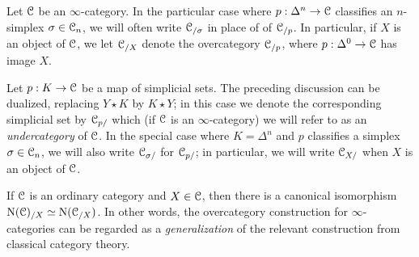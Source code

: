 \begin{1.2.9 Over- and under-categories}
\begin{remark}
Let $\operatorname{\mathcal{C}}$ be an $\infty$-category.
In the particular case where $p: \Delta^n \rightarrow \operatorname{\mathcal{C}}$ classifies an
$n$-simplex $\sigma \in \operatorname{\mathcal{C}}_n$, we will often write $\operatorname{\mathcal{C}}_{/\sigma}$ in place of of $\operatorname{\mathcal{C}}_{/p}$.
In particular, if $X$ is an object of $\operatorname{\mathcal{C}}$, we let $\operatorname{\mathcal{C}}_{/X}$ denote the overcategory
$\operatorname{\mathcal{C}}_{/p}$, where $p: \Delta^0 \rightarrow \operatorname{\mathcal{C}}$ has image $X$.
\end{remark}

\begin{remark} Let $p: K \rightarrow \operatorname{\mathcal{C}}$ be a map of simplicial sets. The
preceding discussion can be dualized, replacing $Y \star K$
by $K \star Y$; in this case we denote the corresponding simplicial set
by $\operatorname{\mathcal{C}}_{p/}$ which (if $\operatorname{\mathcal{C}}$ is an $\infty$-category) we will refer to as an
{\it undercategory} of $\operatorname{\mathcal{C}}$. In the special case where $K = \Delta^n$ and $p$ classifies a simplex $\sigma \in \operatorname{\mathcal{C}}_{n}$, we will also write $\operatorname{\mathcal{C}}_{\sigma/}$ for $\operatorname{\mathcal{C}}_{p/}$; in particular, we will write $\operatorname{\mathcal{C}}_{X/}$ when $X$ is an object of $\operatorname{\mathcal{C}}$.
\end{remark}

\begin{remark}
If $\operatorname{\mathcal{C}}$ is an ordinary category and $X \in \operatorname{\mathcal{C}}$,
then there is a canonical isomorphism $\operatorname{N}(\operatorname{\mathcal{C}})_{/X} \simeq \operatorname{N} (\operatorname{\mathcal{C}}_{/X})$. In other words, the overcategory construction for $\infty$-categories can be regarded as a {\em generalization} of the relevant construction from classical category theory.
\end{remark}
\end{1.2.9 Over- and under-categories}
